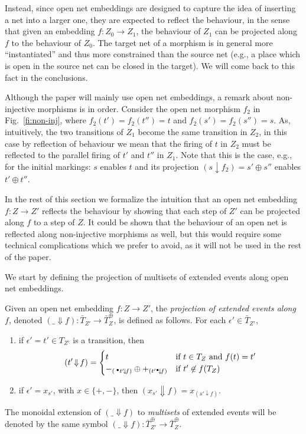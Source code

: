 \documentclass{LMCS}
\newcommand{\monSub}[2]{\ensuremath{{#1}_{#2}^\oplus}}
\newcommand{\res}[2]{\ensuremath{({#1}\!\downarrow\!{#2})}}
\newcommand{\sres}[2]{\ensuremath{({#1}\!\Downarrow\!{#2})}}
\newcommand{\pre}[1][(\cdot)]{\ensuremath{\!~^\bullet{#1}}}
\newcommand{\post}[1][(\cdot)]{\ensuremath{{#1} {^\bullet}}}
\begin{document}
Instead, since open net embeddings are designed to capture the idea of
inserting a net into a larger one, they are expected to reflect the
behaviour, in the sense that given an embedding $f : Z_0 \to Z_1$, the
behaviour of $Z_1$ can be projected along $f$ to the
behaviour of $Z_0$.
The target net of a morphism is in general more ``instantiated'' and
thus more constrained than the source net (e.g., a place which is open
in the source net can be closed in the target).
We will come back to this fact in the conclusions.

Although the paper will mainly use open net embeddings, a remark about
non-injective morphisms is in order. Consider the open net morphism
$f_2$ in Fig.~\ref{fi:non-inj}, where $f_2(t') = f_2(t'') = t$ and
$f_2(s') = f_2(s'') = s$. As, intuitively, the two transitions of
$Z_1$ become the same transition in $Z_2$, in this case by reflection
of behaviour we mean that the firing of $t$ in $Z_2$ must be reflected
to the parallel firing of $t'$ and $t''$ in $Z_1$.  Note that this is
the case, e.g., for the initial markings: $s$ enables $t$ and its
projection $\res{s}{f_2} = s' \oplus s''$ enables $t' \oplus
t''$. 

In the rest of this section we formalize the intuition that an open
net embedding $f: Z \to Z'$ reflects the behaviour by showing that
each step of $Z'$ can be projected along $f$ to a step of $Z$. 
It could be shown that the behaviour of an open net is reflected
along non-injective morphisms as well,  but this would require
some technical complications which we prefer to avoid, as it will not
be used in the rest of the paper.




We start by defining the projection of multisets of extended events
along open net embeddings.


\begin{defi}
  Given an open net embedding $f: Z \to Z'$, the \emph{projection of
    extended events along $f$}, denoted  $\sres{\_}{f} :
    \bar{T}_{Z'} \to \monSub{\bar{T}}{Z}$, is defined as
    follows. For each  $\epsilon' \in \bar{T}_{Z'}$,

  \begin{enumerate}[$\bullet$]
    
  \item if $\epsilon' = t' \in T_{Z'}$ is a transition, then
    \[\sres{t'}{f} = 
    \begin{cases}
          t & \hbox{if $t \in T_Z$ and $f(t) = t'$}\cr
          -_{\res{\pre[t']}{f}} \oplus +_{\res{\post[t']}{f}}
            & \hbox{if $t'\not\in f(T_Z)$}
    \end{cases}\]
    \smallskip
  \item if $\epsilon' = x_{s'}$, with $x \in \{+,-\}$,
then $\sres{x_{s'}}{f} =
    x_{\res{s'}{f}}$.
  \end{enumerate}
  The monoidal extension of $\sres{\_}{f}$ to \emph{multisets}
  of extended events will be denoted by the same symbol 
  $\sres{\_}{f} : \monSub{\bar{T}}{{Z'}} \to \monSub{\bar{T}}{Z}$.
\end{defi}  
\end{document}
